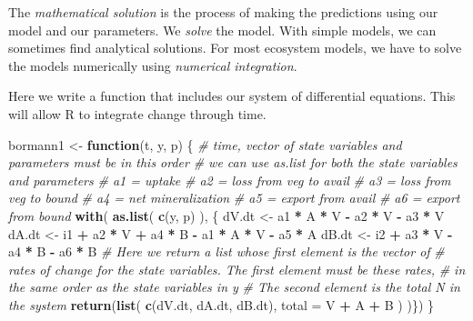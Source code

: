 \documentclass[
]{book}
\newenvironment{Shaded}{\begin{snugshade}}{\end{snugshade}}
\newcommand{\CommentTok}[1]{\textcolor[rgb]{0.56,0.35,0.01}{\textit{#1}}}
\newcommand{\ControlFlowTok}[1]{\textcolor[rgb]{0.13,0.29,0.53}{\textbf{#1}}}
\newcommand{\DataTypeTok}[1]{\textcolor[rgb]{0.13,0.29,0.53}{#1}}
\newcommand{\KeywordTok}[1]{\textcolor[rgb]{0.13,0.29,0.53}{\textbf{#1}}}
\newcommand{\NormalTok}[1]{#1}
\newcommand{\OperatorTok}[1]{\textcolor[rgb]{0.81,0.36,0.00}{\textbf{#1}}}
\newcommand{\StringTok}[1]{\textcolor[rgb]{0.31,0.60,0.02}{#1}}
\begin{document}
The \emph{mathematical solution} is the process of making the
predictions using our model and our parameters. We \emph{solve} the
model. With simple models, we can sometimes find analytical
solutions. For most ecosystem models, we have to solve the models
numerically using \emph{numerical integration}.

Here we write a function that includes our system of differential
equations. This will allow R to integrate change through time.

\begin{Shaded}
\begin{Highlighting}[]
\NormalTok{bormann1 <-}\StringTok{ }\ControlFlowTok{function}\NormalTok{(t, y, p) \{}
  \CommentTok{# time, vector of state variables and parameters must be in this order}
  \CommentTok{# we can use as.list for both the state variables and parameters}
  \CommentTok{# a1 = uptake}
  \CommentTok{# a2 = loss from veg to avail}
  \CommentTok{# a3 = loss from veg to bound}
  \CommentTok{# a4 = net mineralization}
  \CommentTok{# a5 = export from avail}
  \CommentTok{# a6 = export from bound}
  \KeywordTok{with}\NormalTok{( }\KeywordTok{as.list}\NormalTok{( }\KeywordTok{c}\NormalTok{(y, p) ), \{}
\NormalTok{    dV.dt <-}\StringTok{ }\NormalTok{a1 }\OperatorTok{*}\StringTok{ }\NormalTok{A }\OperatorTok{*}\StringTok{ }\NormalTok{V }\OperatorTok{-}\StringTok{ }\NormalTok{a2 }\OperatorTok{*}\StringTok{ }\NormalTok{V }\OperatorTok{-}\StringTok{ }\NormalTok{a3 }\OperatorTok{*}\StringTok{ }\NormalTok{V}
\NormalTok{    dA.dt <-}\StringTok{ }\NormalTok{i1 }\OperatorTok{+}\StringTok{ }\NormalTok{a2 }\OperatorTok{*}\StringTok{ }\NormalTok{V }\OperatorTok{+}\StringTok{ }\NormalTok{a4 }\OperatorTok{*}\StringTok{ }\NormalTok{B }\OperatorTok{-}\StringTok{ }\NormalTok{a1 }\OperatorTok{*}\StringTok{ }\NormalTok{A }\OperatorTok{*}\StringTok{ }\NormalTok{V }\OperatorTok{-}\StringTok{ }\NormalTok{a5 }\OperatorTok{*}\StringTok{ }\NormalTok{A }
\NormalTok{    dB.dt <-}\StringTok{ }\NormalTok{i2 }\OperatorTok{+}\StringTok{ }\NormalTok{a3 }\OperatorTok{*}\StringTok{ }\NormalTok{V }\OperatorTok{-}\StringTok{ }\NormalTok{a4 }\OperatorTok{*}\StringTok{ }\NormalTok{B }\OperatorTok{-}\StringTok{ }\NormalTok{a6 }\OperatorTok{*}\StringTok{ }\NormalTok{B }
    \CommentTok{# Here we return a list whose first element is the vector of}
    \CommentTok{# rates of change for the state variables. The first element must be these rates,}
    \CommentTok{# in the same order as the state variables in y}
    \CommentTok{# The second element is the total N in the system}
    \KeywordTok{return}\NormalTok{(}\KeywordTok{list}\NormalTok{( }\KeywordTok{c}\NormalTok{(dV.dt, dA.dt, dB.dt), }
                 \DataTypeTok{total =}\NormalTok{ V }\OperatorTok{+}\StringTok{ }\NormalTok{A }\OperatorTok{+}\StringTok{ }\NormalTok{B }
\NormalTok{                 )  )\})}
\NormalTok{\}}
\end{Highlighting}
\end{Shaded}
\end{document}
